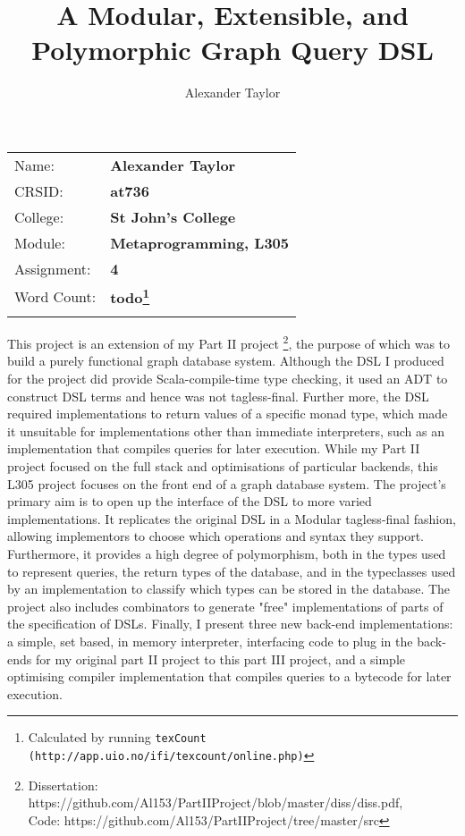 \documentclass{report}
\newcommand \2[0]{\textbf{2}}
\newcommand \3[0]{\textbf{3}}
\newcommand{\todo}[1]{\textbf{#1}}
\begin{document}
\title{A Modular, Extensible, and Polymorphic Graph Query DSL}
\author{Alexander Taylor}

\maketitle
{\large
\begin{tabular}{p{5cm}p{10cm}}
Name:       & \bf Alexander Taylor      \\
CRSID:      & \bf at736 \\
College:    & \bf St John's College  \\
Module:     & \bf Metaprogramming, L305 \\
Assignment: & \bf 4 \\
Word Count: & \bf \todo{todo}\footnote{Calculated by running \texttt{texCount (http://app.uio.no/ifi/texcount/online.php)}}   \\
                   \\ 
\end{tabular}
}



\abstract
This project is an extension of my Part II project \footnote{Dissertation: https://github.com/Al153/PartIIProject/blob/master/diss/diss.pdf,\\ Code: https://github.com/Al153/PartIIProject/tree/master/src}, the purpose of which was to build a purely functional graph database system. Although the DSL I produced for the project did provide Scala-compile-time type checking, it used an ADT to construct DSL terms and hence was not tagless-final. Further more, the DSL required implementations to return values of a specific monad type, which made it unsuitable for implementations other than immediate interpreters, such as an implementation that compiles queries for later execution. While my Part II project focused on the full stack and optimisations of particular backends, this L305 project focuses on the front end of a graph database system. The project's primary aim is to open up the interface of the DSL to more varied implementations. It replicates the original DSL in a Modular tagless-final fashion, allowing implementors to choose which operations and syntax they support. Furthermore, it provides a high degree of polymorphism, both in the types used to represent queries, the return types of the database, and in the typeclasses used by an implementation to classify which types can be stored in the database. The project also includes combinators to generate "free" implementations of parts of the specification of DSLs. Finally, I present three new back-end implementations: a simple, set based, in memory interpreter, interfacing code to plug in the back-ends for my original part II project to this part III project, and a simple optimising compiler implementation that compiles queries to a bytecode for later execution.
\end{document}
